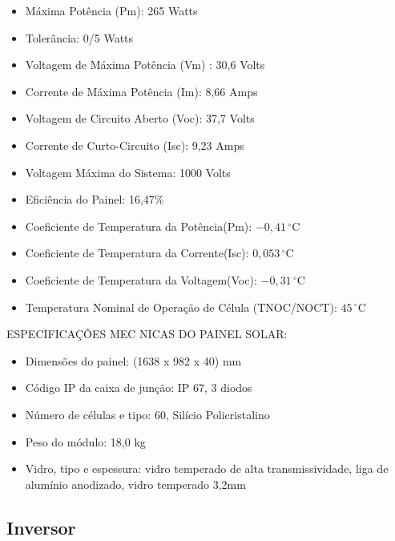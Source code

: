 \begin{itemize}
\item Máxima Potência (Pm):	265 Watts
\item Tolerância: 0/5 Watts
\item Voltagem de Máxima Potência (Vm) : 30,6 Volts
\item Corrente de Máxima Potência (Im): 8,66 Amps
\item Voltagem de Circuito Aberto (Voc): 37,7 Volts
\item Corrente de Curto-Circuito (Isc): 9,23 Amps
\item Voltagem Máxima do Sistema: 1000 Volts
\item Eficiência do Painel: 16,47\%
\item Coeficiente de Temperatura da Potência(Pm):  $-0,41\,^{\circ}\mathrm{C}$
\item Coeficiente de Temperatura da Corrente(Isc): $0,053\,^{\circ}\mathrm{C}$
\item Coeficiente de Temperatura da Voltagem(Voc): $-0,31\,^{\circ}\mathrm{C}$
\item Temperatura Nominal de Operação de Célula (TNOC/NOCT):   $45\,^{\circ}\mathrm{C}$
\end{itemize}
ESPECIFICAÇÕES MEC NICAS DO PAINEL SOLAR:
\begin{itemize}
\item Dimensões do painel: (1638 x 982 x 40) mm
\item Código IP da caixa de junção: IP 67, 3 diodos
\item Número de células e tipo:  60, Silício Policristalino
\item Peso do módulo: 18,0 kg
\item Vidro, tipo e espessura: vidro temperado de alta transmissividade, liga de alumínio anodizado, vidro temperado 3,2mm
\end{itemize}

\subsection{Inversor}

